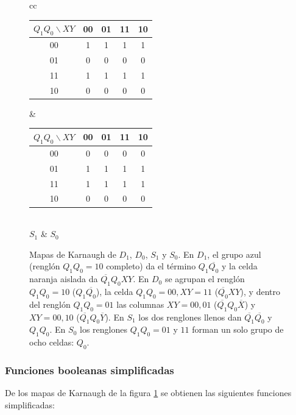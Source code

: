 \begin{figure}[H]
\vspace{8pt}
\begin{tabular}{cc}
\begin{tabular}{c|cccc}
 $Q_1Q_0\backslash XY$ & 00 & 01 & 11 & 10 \\
\hline
00 & \cellcolor{kgroupa}1 & \cellcolor{kgroupa}1 & \cellcolor{kgroupa}1 & \cellcolor{kgroupa}1 \\
01 & 0 & 0 & 0 & 0 \\
11 & \cellcolor{kgroupb}1 & \cellcolor{kgroupb}1 & \cellcolor{kgroupb}1 & \cellcolor{kgroupb}1 \\
10 & 0 & 0 & 0 & 0 \\
\end{tabular}
&
\begin{tabular}{c|cccc}
 $Q_1Q_0\backslash XY$ & 00 & 01 & 11 & 10 \\
\hline
00 & 0 & 0 & 0 & 0 \\
01 & \cellcolor{kgroupa}1 & \cellcolor{kgroupa}1 & \cellcolor{kgroupa}1 & \cellcolor{kgroupa}1 \\
11 & \cellcolor{kgroupa}1 & \cellcolor{kgroupa}1 & \cellcolor{kgroupa}1 & \cellcolor{kgroupa}1 \\
10 & 0 & 0 & 0 & 0 \\
\end{tabular}
\\[4pt]
$S_1$ & $S_0$ \\
\end{tabular}
\caption{Mapas de Karnaugh de $D_1$, $D_0$, $S_1$ y $S_0$. En $D_1$, el grupo azul
  (renglón $Q_1Q_0=10$ completo) da el término $Q_1\overline{Q_0}$ y la celda naranja
  aislada da $\overline{Q_1}Q_0XY$. En $D_0$ se agrupan el renglón $Q_1Q_0=10$
  ($Q_1\overline{Q_0}$), la celda $Q_1Q_0=00,XY=11$ ($\overline{Q_0}XY$), y dentro del
  renglón $Q_1Q_0=01$ las columnas $XY=00,01$ ($\overline{Q_1}Q_0\overline{X}$) y
  $XY=00,10$ ($\overline{Q_1}Q_0\overline{Y}$). En $S_1$ los dos renglones llenos dan
  $\overline{Q_1}\overline{Q_0}$ y $Q_1Q_0$. En $S_0$ los renglones $Q_1Q_0=01$ y $11$
  forman un solo grupo de ocho celdas: $Q_0$.}
\label{fig:kmaps}
\end{figure}

\subsubsection{Funciones booleanas simplificadas}

De los mapas de Karnaugh de la figura \ref{fig:kmaps} se obtienen las siguientes
funciones simplificadas:

